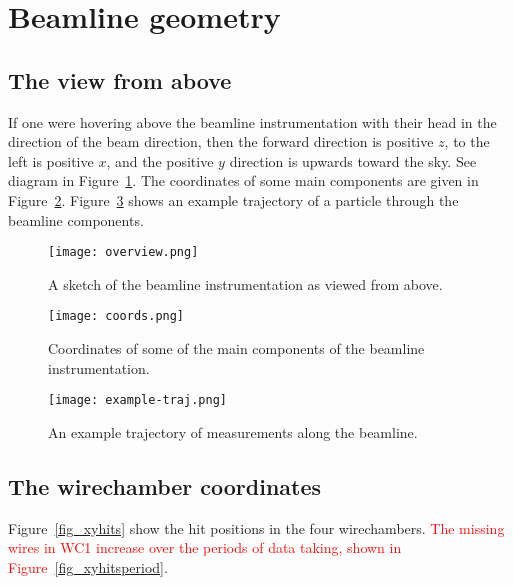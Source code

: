 \section{Beamline geometry}

\subsection{The view from above}

If one were hovering above the beamline instrumentation with their head in the direction of the beam direction, then the forward direction is positive $z$, to the left is positive $x$, and the positive $y$ direction is upwards toward the sky. See diagram in Figure~\ref{fig_overview}. The coordinates of some main components are given in Figure~\ref{fig_coords}. Figure~\ref{fig_traj} shows an example trajectory of a particle through the beamline components.
\begin{figure}[h]	  
 \centering 
        	\texttt{[image: overview.png]}	 
   \caption[short]{A sketch of the beamline instrumentation as viewed from above.}
   \label{fig_overview}
  \end{figure}

\begin{figure}[h]	   
 \centering
        	\texttt{[image: coords.png]}	 
   \caption[short]{Coordinates of some of the main components of the beamline instrumentation.}
   \label{fig_coords}
  \end{figure}
  
    \begin{figure}[h]	   
 \centering
        	\texttt{[image: example-traj.png]}	 
   \caption[short]{An example trajectory of measurements along the beamline.}
   \label{fig_traj}
  \end{figure}
  
  
\subsection{The wirechamber coordinates}

Figure~\ref{fig_xyhits} show the hit positions in the four wirechambers. \textcolor{red}{The missing wires in WC1 increase over the periods of data taking, shown in Figure~\ref{fig_xyhitsperiod}}.

